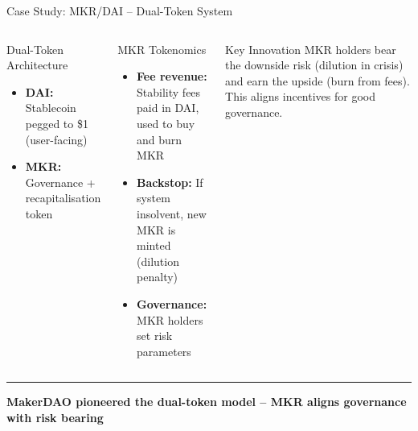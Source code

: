 \documentclass[8pt,aspectratio=169]{beamer}
\newcommand{\bottomnote}[1]{\vfill\vspace{-2mm}\textcolor{mllavender2}{\rule{\textwidth}{0.4pt}}\vspace{1mm}\footnotesize\textbf{#1}}
\begin{document}
\begin{frame}{Case Study: MKR/DAI -- Dual-Token System}
\begin{columns}[T]
\begin{block}{Dual-Token Architecture}
\footnotesize
\begin{itemize}
  \item \textbf{DAI:} Stablecoin pegged to \$1 (user-facing)
  \item \textbf{MKR:} Governance + recapitalisation token
\end{itemize}
\end{block}
\vspace{1mm}

\begin{block}{MKR Tokenomics}
\footnotesize
\begin{itemize}
  \item \textbf{Fee revenue:} Stability fees paid in DAI, used to buy and burn MKR
  \item \textbf{Backstop:} If system insolvent, new MKR is minted (dilution penalty)
  \item \textbf{Governance:} MKR holders set risk parameters
\end{itemize}
\end{block}
\vspace{2mm}
\begin{exampleblock}{\footnotesize Key Innovation}
\footnotesize
MKR holders bear the downside risk (dilution in crisis) and earn the upside (burn from fees). This aligns incentives for good governance.
\end{exampleblock}
\end{columns}
\bottomnote{MakerDAO pioneered the dual-token model -- MKR aligns governance with risk bearing}
\end{frame}
\end{document}
